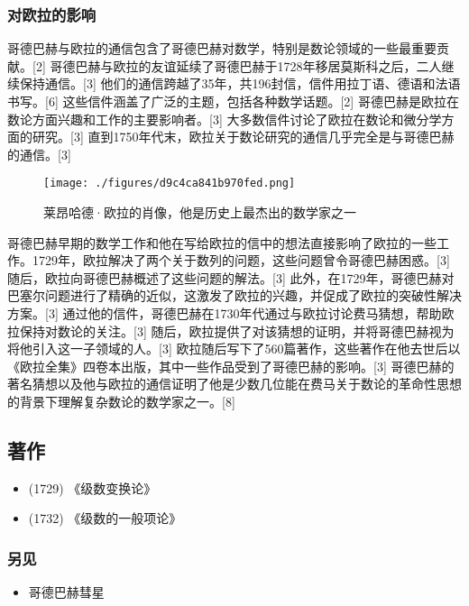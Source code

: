 \subsubsection{对欧拉的影响} 
哥德巴赫与欧拉的通信包含了哥德巴赫对数学，特别是数论领域的一些最重要贡献。[2] 哥德巴赫与欧拉的友谊延续了哥德巴赫于1728年移居莫斯科之后，二人继续保持通信。[3] 他们的通信跨越了35年，共196封信，信件用拉丁语、德语和法语书写。[6] 这些信件涵盖了广泛的主题，包括各种数学话题。[2] 哥德巴赫是欧拉在数论方面兴趣和工作的主要影响者。[3] 大多数信件讨论了欧拉在数论和微分学方面的研究。[3] 直到1750年代末，欧拉关于数论研究的通信几乎完全是与哥德巴赫的通信。[3]
\begin{figure}[ht]
\centering
\texttt{[image: ./figures/d9c4ca841b970fed.png]}
\caption{莱昂哈德·欧拉的肖像，他是历史上最杰出的数学家之一} \label{fig_Goldba_3}
\end{figure}
哥德巴赫早期的数学工作和他在写给欧拉的信中的想法直接影响了欧拉的一些工作。1729年，欧拉解决了两个关于数列的问题，这些问题曾令哥德巴赫困惑。[3] 随后，欧拉向哥德巴赫概述了这些问题的解法。[3] 此外，在1729年，哥德巴赫对巴塞尔问题进行了精确的近似，这激发了欧拉的兴趣，并促成了欧拉的突破性解决方案。[3] 通过他的信件，哥德巴赫在1730年代通过与欧拉讨论费马猜想，帮助欧拉保持对数论的关注。[3] 随后，欧拉提供了对该猜想的证明，并将哥德巴赫视为将他引入这一子领域的人。[3] 欧拉随后写下了560篇著作，这些著作在他去世后以《欧拉全集》四卷本出版，其中一些作品受到了哥德巴赫的影响。[3] 哥德巴赫的著名猜想以及他与欧拉的通信证明了他是少数几位能在费马关于数论的革命性思想的背景下理解复杂数论的数学家之一。[8]
\subsection{著作}  
\begin{itemize}
\item (1729) 《级数变换论》  
\item (1732) 《级数的一般项论》
\end{itemize}
\subsubsection{另见}  
\begin{itemize}
\item 哥德巴赫彗星
\end{itemize}
